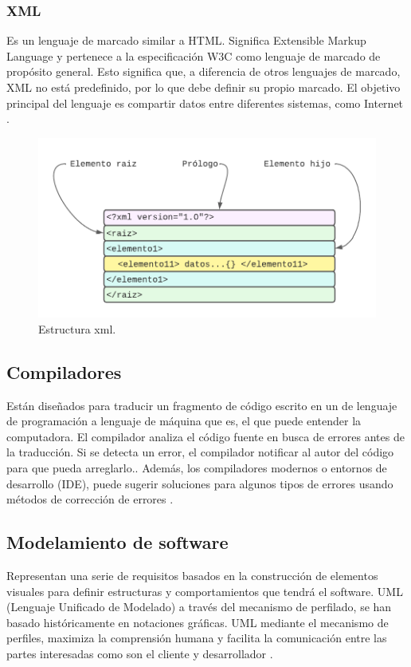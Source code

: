 \subsubsection{XML}

Es un lenguaje de marcado similar a HTML. Significa Extensible Markup Language y pertenece a la especificación W3C como lenguaje de marcado de propósito general. Esto significa que, a diferencia de otros lenguajes de marcado, XML no está predefinido, por lo que debe definir su propio marcado. El objetivo principal del lenguaje es compartir datos entre diferentes sistemas, como Internet \cite{XML-based}.

\begin{figure}[h!]
	\centering
	\includegraphics[width=12cm]{img/xml.png}
	\caption{Estructura xml.}
	\label{fig:xml}
\end{figure}

\subsection{Compiladores}
Están diseñados para traducir un fragmento de código escrito en un de lenguaje de programación a lenguaje de máquina que es, el que puede entender la computadora. El compilador analiza el código fuente en busca de errores antes de la traducción. Si se detecta un error, el compilador
notificar al autor del código para que pueda arreglarlo.. Además, los compiladores modernos o entornos de desarrollo (IDE), puede sugerir soluciones para algunos tipos de errores usando métodos de corrección de errores \cite{CoEdit}.

\subsection{Modelamiento de software}
Representan una serie de requisitos basados en la construcción de elementos visuales para definir estructuras y comportamientos que tendrá el software. UML (Lenguaje Unificado de Modelado) a través del mecanismo de perfilado, se han basado históricamente en notaciones gráficas. UML mediante el mecanismo de perfiles, maximiza la comprensión humana y facilita la comunicación entre las partes interesadas como son el cliente y desarrollador \cite{Blended}. 


